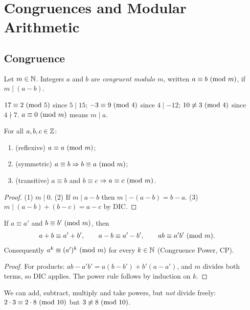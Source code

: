 \chapter{Congruences and Modular Arithmetic}

\section{Congruence}

\begin{definition}
Let $m \in \mathbb{N}$. Integers $a$ and $b$ are \emph{congruent modulo $m$}, written
$a \equiv b \ (\mathrm{mod}\ m)$, if $m \mid (a - b)$.
\end{definition}

\begin{example}
$17 \equiv 2 \ (\mathrm{mod}\ 5)$ since $5 \mid 15$; $-3 \equiv 9 \ (\mathrm{mod}\ 4)$ since $4 \mid -12$;
$10 \not\equiv 3 \ (\mathrm{mod}\ 4)$ since $4\nmid 7$. $a\equiv 0 \ (\mathrm{mod}\ m)$ means $m \mid a$.
\end{example}

\begin{proposition}
For all $a,b,c\in\mathbb{Z}$:
\begin{enumerate}
  \item (reflexive) $a \equiv a \ (\mathrm{mod}\ m)$;
  \item (symmetric) $a \equiv b \Rightarrow b \equiv a \ (\mathrm{mod}\ m)$;
  \item (transitive) $a \equiv b$ and $b \equiv c$ $\Rightarrow a \equiv c \ (\mathrm{mod}\ m)$.
\end{enumerate}
\end{proposition}
\begin{proof}
(1) $m \mid 0$. (2) If $m \mid a - b$ then $m \mid -(a-b) = b - a$. (3) $m \mid (a - b) + (b - c)
= a - c$ by DIC.
\end{proof}

\begin{theorem}
If $a \equiv a'$ and $b \equiv b' \ (\mathrm{mod}\ m)$, then
\[ a + b \equiv a' + b', \qquad a - b \equiv a' - b', \qquad ab \equiv a'b' \ (\mathrm{mod}\ m). \]
Consequently $a^k \equiv (a')^k \ (\mathrm{mod}\ m)$ for every $k \in \mathbb{N}$ (Congruence Power, CP).
\end{theorem}
\begin{proof}
For products: $ab - a'b' = a(b - b') + b'(a - a')$, and $m$ divides both terms, so DIC applies.
The power rule follows by induction on $k$.
\end{proof}

\begin{important}
We can add, subtract, multiply and take powers, but \emph{not} divide freely:
$2\cdot 3 \equiv 2 \cdot 8 \ (\mathrm{mod}\ 10)$ but $3 \not\equiv 8 \ (\mathrm{mod}\ 10)$.
\end{important}

